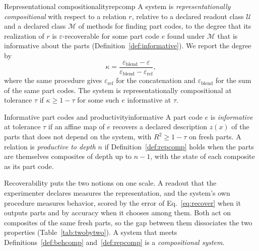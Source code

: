 \documentclass[10pt]{article}
\theoremstyle{plain}
\theoremstyle{remark}
\newcommand{\U}{\mathcal{U}}
\newcommand{\M}{\mathcal{M}}
\begin{document}
\begin{defbox}{Representational compositionality}{repcomp}
A system is \emph{representationally compositional} with respect to a relation $r$, relative to a declared readout class $\U$ and a declared class $\M$ of methods for finding part codes, to the degree that its realization of $r$ is $\varepsilon$-recoverable for some part code $e$ found under $\M$ that is informative about the parts (Definition~\ref{def:informative}). We report the degree by
\begin{equation}
  \kappa = \frac{\varepsilon_{\mathrm{blend}} - \varepsilon}{\varepsilon_{\mathrm{blend}} - \varepsilon_{\mathrm{ref}}},
  \label{eq:kappa}
\end{equation}
where the same procedure gives $\varepsilon_{\mathrm{ref}}$ for the concatenation and $\varepsilon_{\mathrm{blend}}$ for the sum of the same part codes. The system is representationally compositional at tolerance $\tau$ if $\kappa \ge 1 - \tau$ for some such $e$ informative at $\tau$.
\end{defbox}

\begin{defbox}{Informative part codes and productivity}{informative}
A part code $e$ is \emph{informative} at tolerance $\tau$ if an affine map of $e$ recovers a declared description $z(x)$ of the parts that does not depend on the system, with $R^2 \ge 1 - \tau$ on fresh parts. A relation is \emph{productive to depth $n$} if Definition~\ref{def:repcomp} holds when the parts are themselves composites of depth up to $n - 1$, with the state of each composite as its part code.
\end{defbox}

Recoverability puts the two notions on one scale. A readout that the experimenter declares measures the representation, and the system's own procedure measures behavior, scored by the error of Eq.~\ref{eq:recover} when it outputs parts and by accuracy when it chooses among them. Both act on composites of the same fresh parts, so the gap between them dissociates the two properties (Table~\ref{tab:twobytwo}). A system that meets Definitions~\ref{def:behcomp} and~\ref{def:repcomp} is a \emph{compositional system}.
\end{document}

